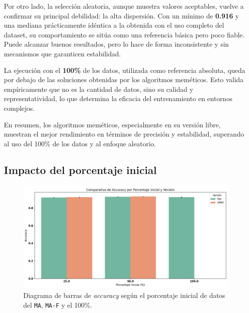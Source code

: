Por otro lado, la selección aleatoria, aunque muestra valores aceptables, vuelve a confirmar su principal debilidad: la alta dispersión.
Con un mínimo de \textbf{0.916} y una mediana prácticamente idéntica a la obtenida con el uso completo del dataset,
su comportamiento se sitúa como una referencia básica pero poco fiable.
Puede alcanzar buenos resultados, pero lo hace de forma inconsistente y sin mecanismos que garanticen estabilidad.

La ejecución con el \textbf{100\%} de los datos, utilizada como referencia absoluta, queda por debajo de las soluciones obtenidas por los algoritmos meméticos.
Esto valida empíricamente que no es la cantidad de datos, sino su calidad y representatividad, lo que determina la eficacia del entrenamiento en entornos complejos.

En resumen, los algoritmos meméticos, especialmente en su versión libre, muestran el mejor rendimiento en términos de precisión y estabilidad,
superando al uso del 100\% de los datos y al enfoque aleatorio.

\subsection{Impacto del porcentaje inicial}
\begin{figure}[htp]
    \centering
    \includegraphics[width=1\textwidth]{imagenes/evaluaciones/painting/comparacion-por-porcentaje.png}
    \caption{Diagrama de barras de \textit{accuracy} según el porcentaje inicial de datos del \texttt{MA}, \texttt{MA-F} y el 100\%.}
    \label{fig:accuracy_porcentaje_painting}
\end{figure}

